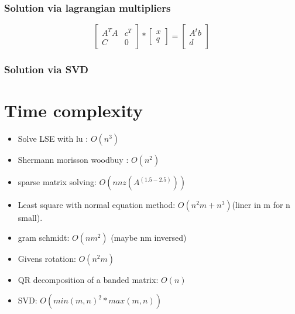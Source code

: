 \documentclass[12pt, a4paper]{article}
\begin{document}
\subsubsection{Solution via lagrangian multipliers}
\begin{equation}
	\begin{bmatrix}
		A^TA & c^T \\ 
		C & 0
	\end{bmatrix}
	*
	\begin{bmatrix}
		x \\
		q
	\end{bmatrix}
	=
	\begin{bmatrix}
		A^t b\\
		d
	\end{bmatrix}
\end{equation}
\subsubsection{Solution via SVD}

\section{Time complexity}

\begin{itemize}
	\item Solve LSE with lu : $O(n^3)$
	\item Shermann morisson woodbuy : $O(n^2)$
	\item sparse matrix solving: $O(nnz(A^{(1.5-2.5)}))$
	\item Least square with normal equation method: $O(n^2m+n^3)$(liner in m for n small).
	\item gram schmidt: $O(nm^2)$ (maybe nm inversed)
	\item Givens rotation: $O(n^2m)$
	\item QR decomposition of a banded matrix: $O(n)$
	\item SVD: $O(min(m,n)^2 * max(m,n))$
\end{itemize}


 
\end{document}
